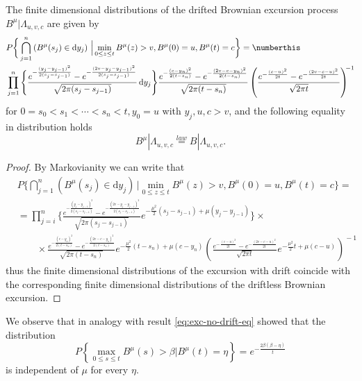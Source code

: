 \begin{theorem}\label{thm:exc-fin-dim}
	The finite dimensional distributions of the drifted Brownian excursion process $ B^\mu | \Lambda_{u,v,c}  $ are given by  
%
\begin{align*}
&
P \bigg\{ \bigcap_{j=1}^n \left( B^\mu(s_j) \in \mathrm d y_j \right) \,\Big \vert \min_{0\leq z \leq t} B^\mu(z)> v , B^\mu(0)=u, B^\mu(t) = c\bigg \}  = \numberthis  \label{eq:exc-fin-dim}\\ 
&   \prod_{j=1}^{n}  
%
\Bigg \{ 
\frac{ e^{ - \frac{(y_j - y _{j-1})^2}{2(s_j - s_{j-1})}  } - 
e^{ - \frac{(2v - y_j - y _{j-1})^2}{2(s_j - s_{j-1})}  } }   {\sqrt{2 \pi ( s_j - s_{j-1})} } \,\mathrm d y_j
\Bigg\} 
%
	\frac{ e^{ - \frac{ (c - y_n) ^ 2}{2(t-s_n)} }
		- e^{ - \frac{ (2v - c  - y_n) ^ 2}{2(t-s_n)}} }{\sqrt{2 \pi (t - s_{n})}}
\left(
	\frac{ e^{ - \frac{ (c - u) ^ 2}{2t} }
		- e^{ - \frac{ (2 v - c  -  u) ^ 2}{2t}} }{\sqrt{2 \pi t}}
\right)^{\!\!-1}
\end{align*}
for $ 0 = s_0 < s_1 < \cdots < s_n < t, y_0 = u $ with $ y_j,u,c > v $, and the following equality in distribution holds
\begin{equation}\label{eq:exc-no-drift-eq}
B^\mu | \Lambda_{u,v,c} \stackrel{law}{=}   B | \Lambda_{u,v,c}. 
\end{equation}
%
%

\end{theorem}

\begin{proof}
	By Markovianity we can write that
\begin{align*}
&
P \bigg\{ \bigcap_{j=1}^n \left( B^\mu(s_j) \in \mathrm d y_j \right) \,\Big \vert \min_{0\leq z \leq t} B^\mu(z)> v , B^\mu(0)=u, B^\mu(t) = c\bigg \}  = \\ 
& =  \prod_{j=i}^{n}  
%
\Bigg \{ 
\frac{ e^{ - \frac{(y_j - y _{j-1})^2}{2(s_j - s_{j-1})}  } - 
	e^{ - \frac{(2v - y_j - y _{j-1})^2}{2(s_j - s_{j-1})}  } }   {\sqrt{2 \pi ( s_j - s_{j-1})} }
e^{ - \frac{ \mu^2}{2} (s_j - s_{j-1}) +    \mu(y_j - y_{j-1})   }
\Bigg\} 
%
\times 
\\
&\qquad \times 
\frac{ e^{ - \frac{ (c - y_n) ^ 2}{2(t-s_n)} }
	- e^{ - \frac{ (2v - c  - y_n) ^ 2}{2(t-s_n)}} }{\sqrt{2 \pi (t - s_{n})}}
e^{ - \frac{ \mu^2}{2} (t - s_{n}) + \mu(c - y_{n}) }
\left(
\frac{ e^{ - \frac{ (c - u) ^ 2}{2t} }
	- e^{ - \frac{ (2 v - c  -  u) ^ 2}{2t}} }{\sqrt{2 \pi t}}
%
e^{- \frac{ \mu^2}{2} t + \mu(c - u)  }
\right)^{\!\!-1}
\end{align*}
thus the finite dimensional distributions of the excursion with drift coincide with the corresponding finite
dimensional distributions of the driftless Brownian excursion. 
\end{proof}
\begin{remark}
	
We observe that in analogy with result   \eqref{eq:exc-no-drift-eq} 
\citet{Beghin1999} showed that the distribution
\[
P\left\{  \max_{ 0 \leq s \leq t} B^\mu(s) > \beta \Big | B^\mu(t) = \eta \right\} 
=
e^{   -  \frac{ 2 \beta (\beta - \eta) }{t}} 
\]
is independent of $\mu$ for every $\eta $.
%
\end{remark}


